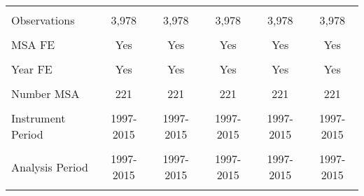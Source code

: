 \begin{tabular}{lccccc}
    & \begin{footnotesize}\end{footnotesize} & \begin{footnotesize}\end{footnotesize} & \begin{footnotesize}\end{footnotesize} & \begin{footnotesize}\end{footnotesize} & \begin{footnotesize}\end{footnotesize} \\
    Observations & 3,978 & 3,978 & 3,978 & 3,978 & 3,978 \\
    \vspace{-2pt} & \vspace{-2pt} & \vspace{-2pt} & \vspace{-2pt} & \vspace{-2pt} \\
    MSA FE & Yes & Yes & Yes & Yes & Yes \\
    \vspace{-2pt} & \vspace{-2pt} & \vspace{-2pt} & \vspace{-2pt} & \vspace{-2pt} \\
    Year FE & Yes & Yes & Yes & Yes & Yes \\
    \vspace{-2pt} & \vspace{-2pt} & \vspace{-2pt} & \vspace{-2pt} & \vspace{-2pt} \\
    Number MSA & 221 & 221 & 221 & 221 & 221 \\
    \vspace{-2pt} & \vspace{-2pt} & \vspace{-2pt} & \vspace{-2pt} & \vspace{-2pt} \\
    Instrument Period & 1997-2015 & 1997-2015 & 1997-2015 & 1997-2015 & 1997-2015 \\
    \vspace{-2pt} & \vspace{-2pt} & \vspace{-2pt} & \vspace{-2pt} & \vspace{-2pt} \\
    Analysis Period & 1997-2015 & 1997-2015 & 1997-2015 & 1997-2015 & 1997-2015\\ 
    \vspace{-2pt} & \vspace{-2pt} & \vspace{-2pt} & \vspace{-2pt} & \vspace{-2pt} \\ \hline
    

\end{tabular}
